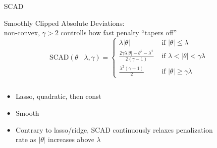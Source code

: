 \documentclass[11pt,compress,t,notes=noshow, xcolor=table]{beamer}
\begin{document}
\begin{vbframe}{SCAD }

Smoothly Clipped Absolute Deviations:\\
non-convex, $\gamma>2$ controlls how fast penalty ``tapers off''
{\footnotesize
$$
\text{SCAD}(\theta \mid \lambda, \gamma)= \begin{cases}\lambda|\theta| & \text { if }|\theta| \leq \lambda \\ \frac{2 \gamma \lambda|\theta|-\theta^2-\lambda^2}{2(\gamma-1)} & \text { if } \lambda<|\theta|<\gamma \lambda \\ \frac{\lambda^2(\gamma+1)}{2} & \text { if }|\theta| \geq \gamma \lambda\end{cases}
$$
}

\begin{columns}

\begin{column}{0.5\textwidth}

{
\begin{itemize}
    \item Lasso, quadratic, then const
    \item Smooth
    \item Contrary to lasso/ridge, SCAD continuously relaxes penalization rate as $|\theta|$ increases above $\lambda$
\end{itemize}

}
\end{column}

\begin{column}{0.5\textwidth}

\begin{figure}
      \centering
    \end{figure}

\end{column}

\end{columns}

\end{vbframe}
\end{document}
